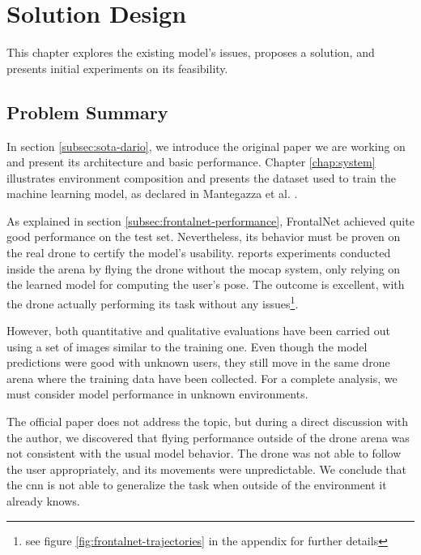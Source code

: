 \chapter{Solution Design}
\label{chap:design}


This chapter explores the existing model's issues, proposes a solution, and presents initial experiments on its feasibility.




\section{Problem Summary}
\label{sec:frontalnet-generalization}

In section \ref{subsec:sota-dario}, we introduce the original paper we are working on and present its architecture and basic performance. Chapter \ref{chap:system} illustrates environment composition and presents the dataset used to train the machine learning model, as declared in Mantegazza et al. \cite{mantegazza2019visionbased}.

\medskip

As explained in section \ref{subsec:frontalnet-performance}, FrontalNet achieved quite good performance on the test set. Nevertheless, its behavior must be proven on the real drone to certify the model's usability. \cite{mantegazza2019visionbased} reports experiments conducted inside the arena by flying the drone without the \gls{mocap} system, only relying on the learned model for computing the user's pose. The outcome is excellent, with the drone actually performing its task without any issues\footnote{see figure \ref{fig:frontalnet-trajectories} in the appendix for further details}.

However, both quantitative and qualitative evaluations have been carried out using a set of images similar to the training one. Even though the model predictions were good with unknown users, they still move in the same drone arena where the training data have been collected. For a complete analysis, we must consider model performance in unknown environments.

The official paper does not address the topic, but during a direct discussion with the author, we discovered that flying performance outside of the drone arena was not consistent with the usual model behavior. The drone was not able to follow the user appropriately, and its movements were unpredictable. We conclude that the \gls{cnn} is not able to generalize the task when outside of the environment it already knows.

